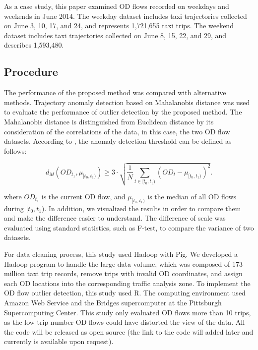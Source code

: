 \documentclass[a4paper,UKenglish]{lipics-v2018}
\begin{document}
As a case study, this paper examined OD flows recorded on weekdays and weekends in June 2014.
The weekday dataset includes taxi trajectories collected on June 3, 10, 17, and 24, and represents 1,721,655 taxi trips.
The weekend dataset includes taxi trajectories collected on June 8, 15, 22, and 29, and describes 1,593,480. 

\subsection{Procedure}

The performance of the proposed method was compared with alternative methods.
Trajectory anomaly detection based on Mahalanobis distance \cite{pan13ACMGIS} was used to evaluate the performance of outlier detection by the proposed method.
The Mahalanobis distance is distinguished from Euclidean distance by its consideration of the correlations of the data, in this case, the two OD flow datasets. 
According to \cite{pan13ACMGIS}, the anomaly detection threshold can be defined as follows:

\begin{equation*}
d_M(OD_{t_1}, \mu_{[t_0,t_1)}) \geq 3\cdot \sqrt{\frac{1}{N}\sum_{t \in [t_0,t_1)} (OD_{t} - \mu_{[t_0,t_1)})^2} .
\end{equation*}

where $OD_{t_1}$ is the current OD flow, and $\mu_{[t_0,t_1)}$ is the median of all OD flows during $[t_0,t_1)$.
In addition, we visualized the results in order to compare them and make the difference easier to understand.
The difference of scale was evaluated using standard statistics, such as F-test, to compare the variance of two datasets. 

For data cleaning process, this study used Hadoop with Pig.
We developed a Hadoop program to handle the large data volume, which was composed of 173 million taxi trip records, remove trips with invalid OD coordinates, and assign each OD locations into the corresponding traffic analysis zone.
To implement the OD flow outlier detection, this study used R.
The computing environment used Amazon Web Service and the Bridges supercomputer at the Pittsburgh Supercomputing Center. 
This study only evaluated OD flows more than 10 trips, as the low trip number OD flows could have distorted the view of the data.
All the code will be released as open source (the link to the code will added later and currently is available upon request).

\end{document}
